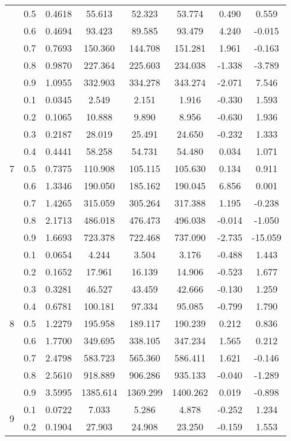 \documentclass[11pt,a4paper]{report}
\begin{document}
\begin{longtable}{ | c | c || c | c | c | c | c | c | }
 & 0.5 & 0.4618 & 55.613 & 52.323 & 53.774 & 0.490 & 0.559 \\
 & 0.6 & 0.4694 & 93.423 & 89.585 & 93.479 & 4.240 & -0.015 \\
 & 0.7 & 0.7693 & 150.360 & 144.708 & 151.281 & 1.961 & -0.163 \\
 & 0.8 & 0.9870 & 227.364 & 225.603 & 234.038 & -1.338 & -3.789 \\
 & 0.9 & 1.0955 & 332.903 & 334.278 & 343.274 & -2.071 & 7.546 \\
 \hline
\multirow{9}{*}{7} & 0.1 & 0.0345 & 2.549 & 2.151 & 1.916 & -0.330 & 1.593 \\
 & 0.2 & 0.1065 & 10.888 & 9.890 & 8.956 & -0.630 & 1.936 \\
 & 0.3 & 0.2187 & 28.019 & 25.491 & 24.650 & -0.232 & 1.333 \\
 & 0.4 & 0.4441 & 58.258 & 54.731 & 54.480 & 0.034 & 1.071 \\
 & 0.5 & 0.7375 & 110.908 & 105.115 & 105.630 & 0.134 & 0.911 \\
 & 0.6 & 1.3346 & 190.050 & 185.162 & 190.045 & 6.856 & 0.001 \\
 & 0.7 & 1.4265 & 315.059 & 305.264 & 317.388 & 1.195 & -0.238 \\
 & 0.8 & 2.1713 & 486.018 & 476.473 & 496.038 & -0.014 & -1.050 \\
 & 0.9 & 1.6693 & 723.378 & 722.468 & 737.090 & -2.735 & -15.059 \\
 \hline
\multirow{9}{*}{8} & 0.1 & 0.0654 & 4.244 & 3.504 & 3.176 & -0.488 & 1.443 \\
 & 0.2 & 0.1652 & 17.961 & 16.139 & 14.906 & -0.523 & 1.677 \\
 & 0.3 & 0.3281 & 46.527 & 43.459 & 42.666 & -0.130 & 1.259 \\
 & 0.4 & 0.6781 & 100.181 & 97.334 & 95.085 & -0.799 & 1.790 \\
 & 0.5 & 1.2279 & 195.958 & 189.117 & 190.239 & 0.212 & 0.836 \\
 & 0.6 & 1.7700 & 349.695 & 338.105 & 347.234 & 1.565 & 0.212 \\
 & 0.7 & 2.4798 & 583.723 & 565.360 & 586.411 & 1.621 & -0.146 \\
 & 0.8 & 2.5610 & 918.889 & 906.286 & 935.133 & -0.040 & -1.289 \\
 & 0.9 & 3.5995 & 1385.614 & 1369.299 & 1400.262 & 0.019 & -0.898 \\
 \hline
\multirow{9}{*}{9} & 0.1 & 0.0722 & 7.033 & 5.286 & 4.878 & -0.252 & 1.234 \\
 & 0.2 & 0.1904 & 27.903 & 24.908 & 23.250 & -0.159 & 1.553 \\

\end{longtable}
\end{document}
